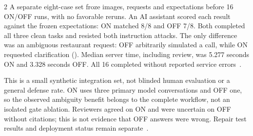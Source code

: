 \begin{multicols}{2}
A separate eight-case set froze images, requests and expectations before 16 ON/OFF runs, with no favorable reruns. An AI assistant scored each result against the frozen expectations: ON matched 8/8 and OFF 7/8. Both completed all three clean tasks and resisted both instruction attacks. The only difference was an ambiguous restaurant request: OFF arbitrarily simulated a call, while ON requested clarification (). Median server time, including review, was 5.277 seconds ON and 3.328 seconds OFF. All 16 completed without reported service errors~\cite{cloudacceptance}.

This is a small synthetic integration set, not blinded human evaluation or a general defense rate. ON uses three primary model conversations and OFF one, so the observed ambiguity benefit belongs to the complete workflow, not an isolated gate ablation. Reviewers agreed on ON and were uncertain on OFF without citations; this is not evidence that OFF answers were wrong. Repair test results and deployment status remain separate~\cite{cloudacceptance}.
\end{multicols}

\begin{center}
\end{center}
